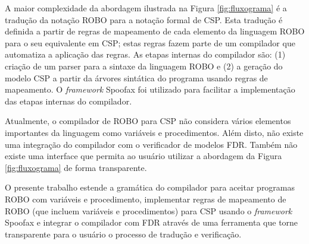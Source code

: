 A maior complexidade da abordagem ilustrada na Figura \ref{fig:fluxograma} é a tradução da notação ROBO para a notação formal de CSP. Esta tradução é definida a partir de regras de mapeamento de cada elemento da linguagem ROBO para o seu equivalente em CSP; estas regras fazem parte de um compilador que automatiza a aplicação das regras. 
As etapas internas do compilador são: (1) criação de um parser para a sintaxe da linguagem ROBO e (2) a geração do modelo CSP a partir da árvores sintática do programa usando regras de mapeamento. 
O \textit{framework} Spoofax foi utilizado para facilitar a implementação das etapas internas do compilador. 

Atualmente, o compilador de ROBO para CSP não considera vários elementos importantes da linguagem como variáveis e procedimentos. Além disto, não existe uma integração do compilador com o verificador de modelos FDR. Também não existe uma interface que permita ao usuário utilizar a abordagem da Figura \ref{fig:fluxograma} de forma transparente. 

O presente trabalho estende a gramática do compilador para aceitar programas ROBO com variáveis e procedimento, implementar regras de mapeamento de ROBO (que incluem variáveis e procedimentos) para CSP usando o \textit{framework} Spoofax  e integrar o compilador com FDR através de uma ferramenta que torne transparente para o usuário o processo de tradução e verificação.

